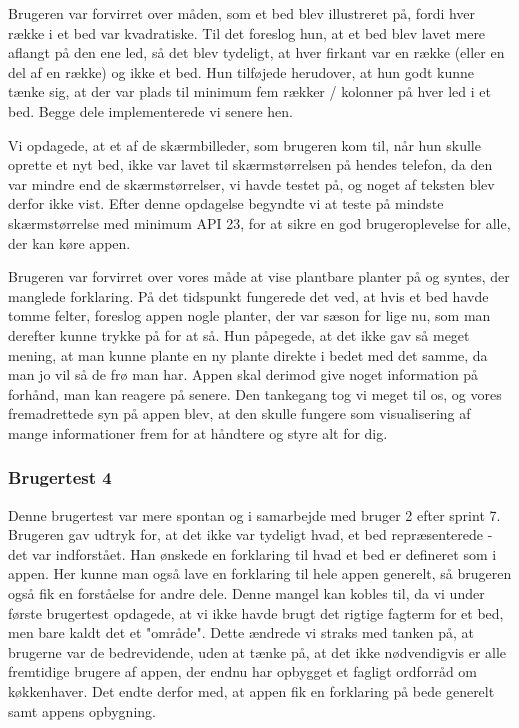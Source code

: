 Brugeren var forvirret over måden, som et bed blev illustreret på, fordi hver række i et bed var kvadratiske. Til det foreslog hun, at et bed blev lavet mere aflangt på den ene led, så det blev tydeligt, at hver firkant var en række (eller en del af en række) og ikke et bed. Hun tilføjede herudover, at hun godt kunne tænke sig, at der var plads til minimum fem rækker / kolonner på hver led i et bed. Begge dele implementerede vi senere hen.

Vi opdagede, at et af de skærmbilleder, som brugeren kom til, når hun skulle oprette et nyt bed, ikke var lavet til skærmstørrelsen på hendes telefon, da den var mindre end de skærmstørrelser, vi havde testet på, og noget af teksten blev derfor ikke vist. Efter denne opdagelse begyndte vi at teste på mindste skærmstørrelse med minimum API 23, for at sikre en god brugeroplevelse for alle, der kan køre appen.

Brugeren var forvirret over vores måde at vise plantbare planter på og syntes, der manglede forklaring. På det tidspunkt fungerede det ved, at hvis et bed havde tomme felter, foreslog appen nogle planter, der var sæson for lige nu, som man derefter kunne trykke på for at så. Hun påpegede, at det ikke gav så meget mening, at man kunne plante en ny plante direkte i bedet med det samme, da man jo vil så de frø man har. Appen skal derimod give noget information på forhånd, man kan reagere på senere. Den tankegang tog vi meget til os, og vores fremadrettede syn på appen blev, at den skulle fungere som visualisering af mange informationer frem for at håndtere og styre alt for dig.

\subsubsection{Brugertest 4}

Denne brugertest var mere spontan og i samarbejde med bruger 2 efter sprint 7. Brugeren gav udtryk for, at det ikke var tydeligt hvad, et bed repræsenterede - det var indforstået. Han ønskede en forklaring til hvad et bed er defineret som i appen. Her kunne man også lave en forklaring til hele appen generelt, så brugeren også fik en forståelse for andre dele. Denne mangel kan kobles til, da vi under første brugertest opdagede, at vi ikke havde brugt det rigtige fagterm for et bed, men bare kaldt det et "område". Dette ændrede vi straks med tanken på, at brugerne var de bedrevidende, uden at tænke på, at det ikke nødvendigvis er alle fremtidige brugere af appen, der endnu har opbygget et fagligt ordforråd om køkkenhaver. Det endte derfor med, at appen fik en forklaring på bede generelt samt appens opbygning.

